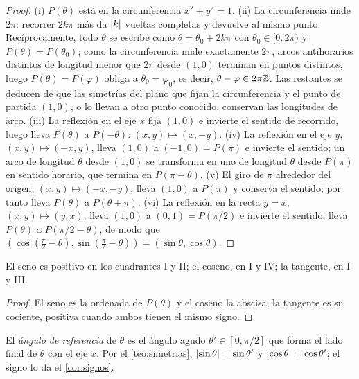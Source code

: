 \begin{proof}
(i) $P(\theta)$ está en la circunferencia $x^{2}+y^{2}=1$. (ii) La circunferencia mide $2\pi$: recorrer $2k\pi$ más da $\lvert k\rvert$ vueltas completas y devuelve al mismo punto. Recíprocamente, todo $\theta$ se escribe como $\theta=\theta_0+2k\pi$ con $\theta_0\in[0,2\pi)$ y $P(\theta)=P(\theta_0)$; como la circunferencia mide exactamente $2\pi$, arcos antihorarios distintos de longitud menor que $2\pi$ desde $(1,0)$ terminan en puntos distintos, luego $P(\theta)=P(\varphi)$ obliga a $\theta_0=\varphi_0$, es decir, $\theta-\varphi\in2\pi\mathbb{Z}$. Las restantes se deducen de que las simetrías del plano que fijan la circunferencia y el punto de partida $(1,0)$, o lo llevan a otro punto conocido, conservan las longitudes de arco. (iii) La reflexión en el eje $x$ fija $(1,0)$ e invierte el sentido de recorrido, luego lleva $P(\theta)$ a $P(-\theta)$: $(x,y)\mapsto(x,-y)$. (iv) La reflexión en el eje $y$, $(x,y)\mapsto(-x,y)$, lleva $(1,0)$ a $(-1,0)=P(\pi)$ e invierte el sentido; un arco de longitud $\theta$ desde $(1,0)$ se transforma en uno de longitud $\theta$ desde $P(\pi)$ en sentido horario, que termina en $P(\pi-\theta)$. (v) El giro de $\pi$ alrededor del origen, $(x,y)\mapsto(-x,-y)$, lleva $(1,0)$ a $P(\pi)$ y conserva el sentido; por tanto lleva $P(\theta)$ a $P(\theta+\pi)$. (vi) La reflexión en la recta $y=x$, $(x,y)\mapsto(y,x)$, lleva $(1,0)$ a $(0,1)=P(\pi/2)$ e invierte el sentido; lleva $P(\theta)$ a $P(\pi/2-\theta)$, de modo que $(\cos(\frac{\pi}{2}-\theta),\sin(\frac{\pi}{2}-\theta))=(\sin\theta,\cos\theta)$.
\end{proof}

\begin{corolario}\label{cor:signos}
El seno es positivo en los cuadrantes I y II; el coseno, en I y IV; la tangente, en I y III.
\end{corolario}

\begin{proof}
El seno es la ordenada de $P(\theta)$ y el coseno la abscisa; la tangente es su cociente, positiva cuando ambos tienen el mismo signo.
\end{proof}

\begin{definicion}
El \emph{ángulo de referencia} de $\theta$ es el ángulo agudo $\theta'\in[0,\pi/2]$ que forma el lado final de $\theta$ con el eje $x$. Por el \cref{teo:simetrias}, $\lvert\sin\theta\rvert=\sin\theta'$ y $\lvert\cos\theta\rvert=\cos\theta'$; el signo lo da el \cref{cor:signos}.
\end{definicion}

